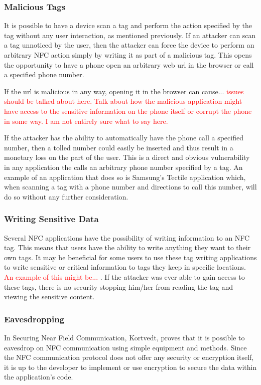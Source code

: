 \documentclass[12pt]{article}
\newcommand\TODO[1]{\textcolor{red}{#1}}
\begin{document}
\subsubsection{Malicious Tags}
It is possible to have a device scan a tag and perform the action specified by the tag without any user interaction, as mentioned previously. If an attacker can scan a tag unnoticed by the user, then the attacker can force the device to perform an arbitrary NFC action simply by writing it as part of a malicious tag. This opens the opportunity to have a phone open an arbitrary web url in the browser or call a specified phone number. 

If the url is malicious in any way, opening it in the browser can cause... \TODO{issues should be talked about here. Talk about how the malicious application might have access to the sensitive information on the phone itself or corrupt the phone in some way. I am not entirely sure what to say here.} 

If the attacker has the ability to automatically have the phone call a specified number, then a tolled number could easily be inserted and thus result in a monetary loss on the part of the user. This is a direct and obvious vulnerability in any application the calls an arbitrary phone number specified by a tag. An example of an application that does so is Samsung's Tectile application which, when scanning a tag with a phone number and directions to call this number, will do so without any further consideration. 

\subsubsection{Writing Sensitive Data}
Several NFC applications have the possibility of writing information to an NFC tag. This means that users have the ability to write anything they want to their own tags. It may be beneficial for some users to use these tag writing applications to write sensitive or critical information to tags they keep in specific locations. \TODO{An example of this might be... }. If the attacker was ever able to gain access to these tags, there is no security stopping him/her from reading the tag and viewing the sensitive content. 

\subsubsection{Eavesdropping}
In Securing Near Field Communication, Kortvedt, proves that it is possible to eavesdrop on NFC communication using simple equipment and methods. Since the NFC communication protocol does not offer any security or encryption itself, it is up to the developer to implement or use encryption to secure the data within the application's code. 
\end{document}
